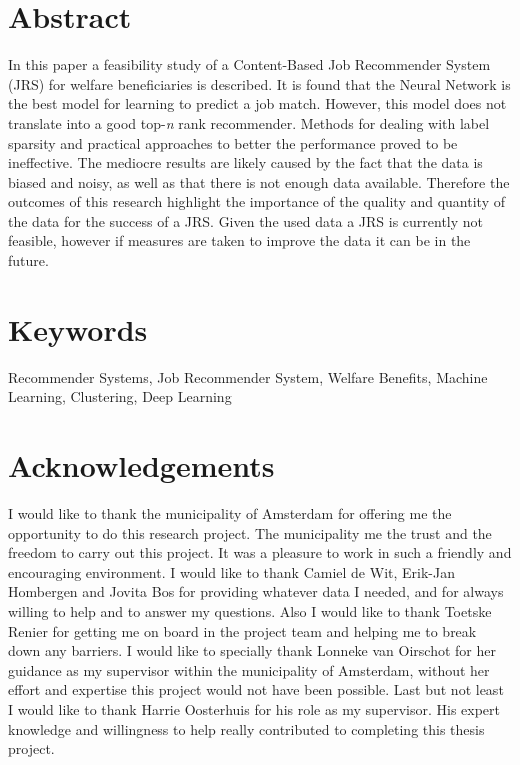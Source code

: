 \documentclass[10pt, sigconf, format=acmsmall, screen=true, review=false]{acmart}
\begin{document}
%

\pagebreak

\pagebreak
\footnotesize


\twocolumn

\section*{Abstract}
In this paper a feasibility study of a Content-Based Job Recommender System (JRS) for welfare beneficiaries is described.
It is found that the Neural Network is the best model for learning to predict a job match. 
However, this model does not translate into a good top-\textit{n} rank recommender. 
Methods for dealing with label sparsity and practical approaches to better the performance proved to be ineffective. 
The mediocre results are likely caused by the fact that the data is biased and noisy, as well as that there is not enough data available.
Therefore the outcomes of this research highlight the importance of the quality and quantity of the data for the success of a JRS.
Given the used data a JRS is currently not feasible, however if measures are taken to improve the data it can be in the future.

\section*{Keywords}
Recommender Systems, Job Recommender System, Welfare Benefits, Machine Learning, Clustering, Deep Learning










\section*{Acknowledgements}
I would like to thank the municipality of Amsterdam for offering me the opportunity to do this research project. 
The municipality me the trust and the freedom to carry out this project.
It was a pleasure to work in such a friendly and encouraging environment.
I would like to thank Camiel de Wit, Erik-Jan Hombergen and Jovita Bos for providing whatever data I needed, and for always willing to help and to answer my questions. 
Also I would like to thank Toetske Renier for getting me on board in the project team and helping me to break down any barriers. 
I would like to specially thank Lonneke van Oirschot for her guidance as my supervisor within the municipality of Amsterdam, without her effort and expertise this project would not have been possible. 
Last but not least I would like to thank Harrie Oosterhuis for his role as my supervisor. 
His expert knowledge and willingness to help really contributed to completing this thesis project.




\pagebreak
\onecolumn
\appendix



 
\end{document}
